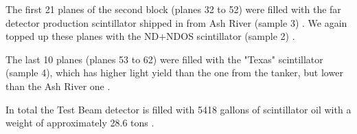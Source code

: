\documentclass[12pt,a4paper]{article}
\begin{document}




The first 21 planes of the second block (planes 32 to 52) were filled with the far detector production scintillator shipped in from Ash River (sample 3) \cite{NOVA-doc-41961}. We again topped up these planes with the ND+NDOS scintillator (sample 2) \cite{NOVA-doc-41961}.

The last 10 planes (planes 53 to 62) \cite{NOVA-doc-41961} were filled with the "Texas" scintillator (sample 4), which has higher light yield than the one from the tanker, but lower than the Ash River one \cite{NOVA-doc-38740}.


In total the Test Beam detector is filled with 5418 gallons of scintillator oil with a weight of approximately 28.6 tons \cite{NOVA-doc-29543}.
\end{document}
